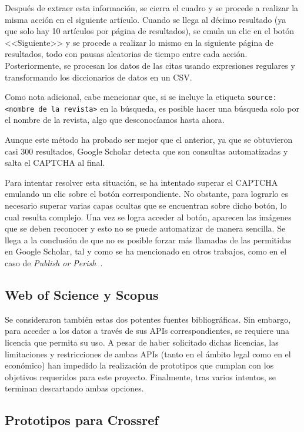 Después de extraer esta información, se cierra el cuadro y se procede a realizar la misma acción en el siguiente artículo. Cuando se llega al décimo resultado (ya que solo hay 10 artículos por página de resultados), se emula un clic en el botón <<Siguiente>> y se procede a realizar lo mismo en la siguiente página de resultados, todo con pausas aleatorias de tiempo entre cada acción. Posteriormente, se procesan los datos de las citas usando expresiones regulares y transformando los diccionarios de datos en un CSV.

Como nota adicional, cabe mencionar que, si se incluye la etiqueta \texttt{source: <nombre de la revista>} en la búsqueda, es posible hacer una búsqueda solo por el nombre de la revista, algo que desconocíamos hasta ahora.

Aunque este método ha probado ser mejor que el anterior, ya que se obtuvieron casi 300 resultados, Google Scholar detecta que son consultas automatizadas y salta el CAPTCHA al final.

Para intentar resolver esta situación, se ha intentado superar el CAPTCHA emulando un clic sobre el botón correspondiente. No obstante, para lograrlo es necesario superar varias capas ocultas que se encuentran sobre dicho botón, lo cual resulta complejo. Una vez se logra acceder al botón, aparecen las imágenes que se deben reconocer y esto no se puede automatizar de manera sencilla. Se llega a la conclusión de que no es posible forzar más llamadas de las permitidas en Google Scholar, tal y como se ha mencionado en otros trabajos, como en el caso de \textit{Publish or Perish}~\cite{harzing2010}.

\subsection{Web of Science y Scopus}

Se consideraron también estas dos potentes fuentes bibliográficas. Sin embargo, para acceder a los datos a través de sus APIs correspondientes, se requiere una licencia que permita su uso. A pesar de haber solicitado dichas licencias, las limitaciones y restricciones de ambas APIs (tanto en el ámbito legal como en el económico) han impedido la realización de prototipos que cumplan con los objetivos requeridos para este proyecto. Finalmente, tras varios intentos, se terminan descartando ambas opciones.

\subsection{Prototipos para Crossref}

